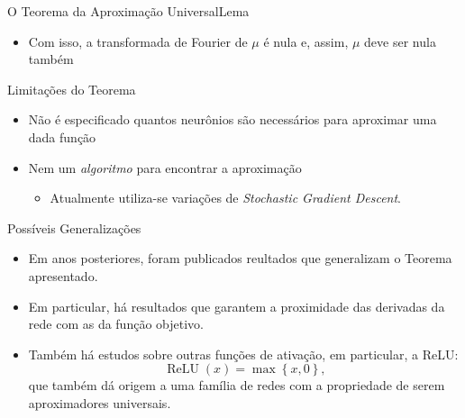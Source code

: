 \documentclass[13pt]{beamer}
\begin{document}
\begin{frame}{O Teorema da Aproximação Universal}{Lema}
    \begin{itemize}
        \item Com isso, a transformada de Fourier de \( \mu \) é nula e, assim, \( \mu \) deve ser nula também
    \end{itemize}
\end{frame}


\begin{frame}{Limitações do Teorema}
    \begin{itemize}
        \item<1-> Não é especificado quantos neurônios são necessários para aproximar uma dada função
        \item<2-> Nem um \emph{algoritmo} para encontrar a aproximação
            \begin{itemize}
                \item<3-> Atualmente utiliza-se variações de \emph{Stochastic Gradient Descent}.
            \end{itemize}
    \end{itemize}
\end{frame}


\begin{frame}{Possíveis Generalizações}
    \begin{itemize}
        \item<1-> Em anos posteriores, foram publicados reultados que generalizam o Teorema apresentado.
        \item<2-> Em particular, há resultados que garantem a proximidade das derivadas da rede com as da função objetivo.
        \item<3-> Também há estudos sobre outras funções de ativação, em particular, a ReLU:
            \begin{equation*}
                \operatorname{ReLU} ( x ) = \max \left\{ x, 0 \right\}
            ,\end{equation*}
            que também dá origem a uma família de redes com a propriedade de serem aproximadores universais.
    \end{itemize}
\end{frame}
\end{document}
